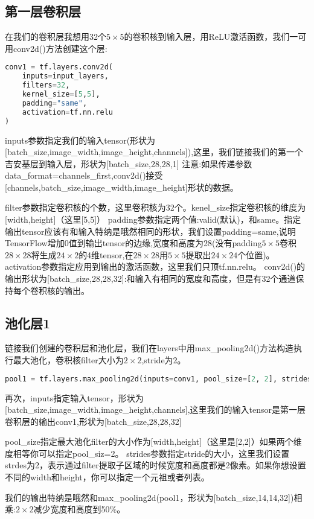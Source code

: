 \subsection{第一层卷积层}
在我们的卷积层我想用32个$5\times5$的卷积核到输入层，用ReLU激活函数，我们一可用conv2d()方法创建这个层:
\begin{lstlisting}[language=Python]
conv1 = tf.layers.conv2d(
    inputs=input_layers,
    filters=32,
    kernel_size=[5,5],
    padding="same",
    activation=tf.nn.relu
)
\end{lstlisting}
\begin{displayquote}
inputs参数指定我们的输入tensor(形状为[batch\_size,image\_width,image\_height,channels]),这里，我们链接我们的第一个吉安基层到输入层，形状为[batch\_size,28,28,1]
注意:如果传递参数data\_format=channels\_first,conv2d()接受[channels,batch\_size,image\_width,image\_height]形状的数据。
\end{displayquote}
filter参数指定卷积核的个数，这里卷积核为32个。kenel\_size指定卷积核的维度为[width,height]（这里[5,5]）
padding参数指定两个值:valid(默认)，和same。指定输出tensor应该有和输入特纳是哦然相同的形状，我们设置padding=same,说明TensorFlow增加0值到输出tensor的边缘,宽度和高度为28(没有padding$5\times5$卷积$28\times28$将生成$24\times2$的4维tensor,在$28\times28$用$5\times5$提取出$24\times24$个位置)。
activation参数指定应用到输出的激活函数，这里我们只顶tf.nn.relu。
conv2d()的输出形状为[batch\_size,28,28,32]:和输入有相同的宽度和高度，但是有32个通道保持每个卷积核的输出。
\subsection{池化层1}
链接我们创建的卷积层和池化层，我们在layers中用max\_pooling2d()方法构造执行最大池化，卷积核filter大小为$2\times2$,stride为2。
\begin{lstlisting}[language=Python]
pool1 = tf.layers.max_pooling2d(inputs=conv1, pool_size=[2, 2], strides=2)
\end{lstlisting}
再次，inputs指定输入tensor，形状为[batch\_size,image\_width,image\_height,channels],这里我们的输入tensor是第一层卷积层的输出conv1,形状为[batch\_size,28,28,32]

pool\_size指定最大池化filter的大小作为[width,height]（这里是[2,2]）如果两个维度相等你可以指定pool\_siz=2。
strides参数指定stride的大小，这里我们设置strdes为2，表示通过filter提取子区域的时候宽度和高度都是2像素。如果你想设置不同的width和height，你可以指定一个元祖或者列表。

我们的输出特纳是哦然和max\_pooling2d(pool1，形状为[batch\_size,14,14,32])相乘:$2\times2$减少宽度和高度到50\%。
